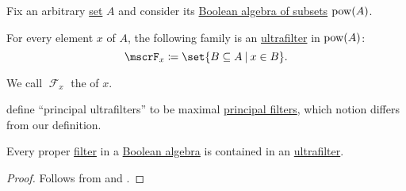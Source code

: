 \begin{definition}\label{def:principal_ultrafilter}
  Fix an arbitrary \hyperref[def:set]{set} \( A \) and consider its \hyperref[thm:boolean_algebra_of_subsets]{Boolean algebra of subsets} \( \operatorname{pow}(A) \).

  For every element \( x \) of \( A \), the following family is an \hyperref[def:ultrafilter]{ultrafilter} in \( \operatorname{pow}(A) \):
  \begin{equation*}
    \mscrF_x \coloneqq \set{ B \subseteq A \given x \in B }.
  \end{equation*}

  We call \( \mscrF_x \) the  of \( x \).
\end{definition}
\begin{comments}
  \item {} define \enquote{principal ultrafilters} to be maximal \hyperref[def:lattice_ideal/principal]{principal filters}, which notion differs from our definition.
\end{comments}

\begin{lemma}\label{thm:ultrafilter_lemma}
  Every proper \hyperref[def:lattice_ideal]{filter} in a \hyperref[def:boolean_algebra]{Boolean algebra} is contained in an \hyperref[def:ultrafilter]{ultrafilter}.
\end{lemma}
\begin{proof}
  Follows from  and .
\end{proof}

